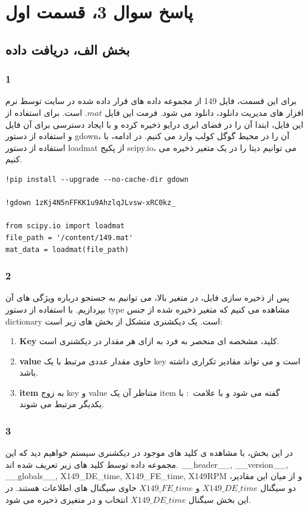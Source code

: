 \section{پاسخ سوال 3، قسمت اول}
\subsection{بخش الف، دریافت داده}
\subsubsection{1}
برای این قسمت، فایل 149 از مجموعه داده های قرار داده شده در سایت توسط نرم افزار های مدیریت دانلود، دانلود می شود. فرمت این فایل $.mat$ است.
برای استفاده از این فایل، ابتدا آن را در فضای ابری درایو ذخیره کرده و با ایجاد دسترسی برای آن فایل و استفاده از دستور gdown، آن را در محیط گوگل کولب وارد می کنیم. 
در ادامه، با استفاده از دستور loadmat از پکیج scipy.io، می توانیم دیتا را در یک متغیر ذخیره می کنیم. 
\begin{verbatim}
!pip install --upgrade --no-cache-dir gdown

!gdown 1zKj4N5nFFKK1u9AhzlqJLvsw-xRC0kz_

from scipy.io import loadmat
file_path = '/content/149.mat'
mat_data = loadmat(file_path)
\end{verbatim}
\subsubsection{2}
پس از ذخیره سازی فایل، در متغیر بالا، می توانیم به جستجو درباره ویژگی های آن بپردازیم. با استفاده از دستور type مشاهده می کنیم که متغیر ذخیره شده از جنس dictionary است.
یک دیکشنری متشکل از بخش های زیر است:
\begin{enumerate}
	\item \textbf{Key} 
	کلید، مشخصه ای منحصر به فرد به ازای هر مقدار در دیکشنری است.
	\item \textbf{value}
	حاوی مقدار عددی مرتبط با یک key است و می تواند مقادیر تکراری داشته باشد.
	\item \textbf{item}
	به زوج key و value متناظر آن یک item گفته می شود و با علامت $:$ با یکدیگر مرتبط می شوند.
\end{enumerate}
\subsubsection{3}
در این بخش، با مشاهده ی کلید های موجود در دیکشنری سیستم خواهیم دید که این مجموعه داده توسط کلید های زیر تعریف شده اند.
\_\_header\_\_, \_\_version\_\_, \_\_globals\_\_, X149\_DE\_time, X149\_FE\_time, X149RPM
و از میان این مقادیر، دو سیگنال $X149\_DE\_time$ و $X149\_FE\_time$ حاوی سیگنال های اطلاعات هستند. در این بخش سیگنال $X149\_DE\_time$ انتخاب و در متغیری ذحیره می شود.
